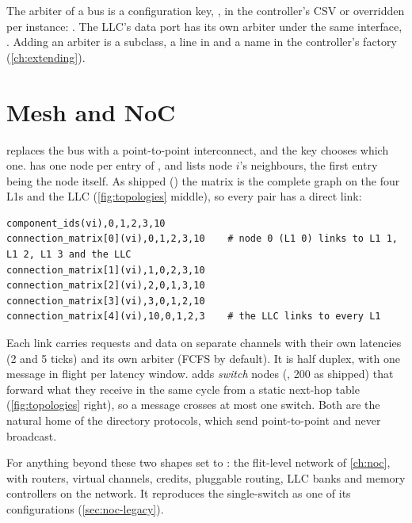 The arbiter of a bus is a configuration key, , in the controller's CSV or
overridden per instance: .
The LLC's data port has its own arbiter under the same interface, .
Adding an arbiter is a subclass, a line in  and a name in the
controller's factory (\cref{ch:extending}).

\section{Mesh and NoC}

 replaces the bus with a point-to-point interconnect, and the key
 chooses which one.  has one node per entry of , and
 lists node $i$'s neighbours, the first entry being the node itself. As
shipped () the matrix is the complete graph on the four
L1s and the LLC (\cref{fig:topologies} middle), so every pair has a direct link:

\begin{lstlisting}[style=csv]
component_ids(vi),0,1,2,3,10
connection_matrix[0](vi),0,1,2,3,10    # node 0 (L1 0) links to L1 1, L1 2, L1 3 and the LLC
connection_matrix[1](vi),1,0,2,3,10
connection_matrix[2](vi),2,0,1,3,10
connection_matrix[3](vi),3,0,1,2,10
connection_matrix[4](vi),10,0,1,2,3    # the LLC links to every L1
\end{lstlisting}

Each link carries requests and data on separate channels with their own latencies (2 and 5
ticks) and its own arbiter (FCFS by default). It is half duplex, with one message in flight per
latency window.  adds \emph{switch} nodes (, 200 as shipped) that forward
what they receive in the same cycle from a static next-hop table (\cref{fig:topologies} right), so a
message crosses at most one switch. Both are the natural home of the directory protocols, which
send point-to-point and never broadcast.

For anything beyond these two shapes set  to : the flit-level
network of \cref{ch:noc}, with routers, virtual channels, credits, pluggable routing, LLC banks and
memory controllers on the network. It reproduces the single-switch  as one of its
configurations (\cref{sec:noc-legacy}).

